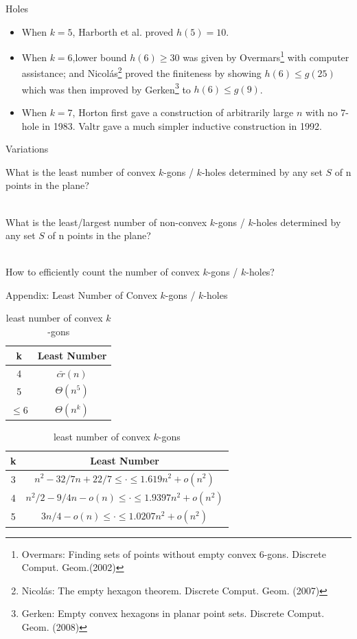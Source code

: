 \documentclass{beamer}
\begin{document}
\begin{frame}{Holes}

	\begin{itemize}
		\item
		      When $k=5$, Harborth et al. proved $h(5)=10$.
		\item
		      When $k=6$,lower bound $h(6) \ge 30$ was given by Overmars\footnote{Overmars: Finding sets of points without empty convex 6-gons. Discrete Comput. Geom.(2002)} with computer assistance; and Nicol\'as\footnote{Nicolás: The empty hexagon theorem. Discrete Comput. Geom. (2007)} proved the finiteness by showing $h(6) \le g(25)$ which was then improved by Gerken\footnote{Gerken: Empty convex hexagons in planar point sets. Discrete Comput. Geom. (2008)} to $h(6) \le g(9)$.
		\item
		      When $k=7$, Horton first gave a construction of arbitrarily large $n$ with no $7$-hole in 1983. Valtr gave a much simpler inductive construction  in 1992.

	\end{itemize}
\end{frame}

\begin{frame}{Variations}

	What is the least number of convex $k$-gons / $k$-holes determined by any set $S$ of n points in the plane? \\~\

	What is the least/largest number of non-convex $k$-gons / $k$-holes determined by any set $S$ of n points in the plane? \\~\

	How to efficiently count the number of convex $k$-gons / $k$-holes?

\end{frame}

\begin{frame}{Appendix: Least Number of Convex $k$-gons / $k$-holes}

	\begin{table}
		\begin{tabular}{c|c}
			k       & Least Number  \\
			\hline \hline
			4       & $\bar{cr}(n)$ \\
			5       & $\Theta(n^5)$ \\
			$\le 6$ & $\Theta(n^k)$
		\end{tabular}

		\caption{least number of convex $k$-gons}

		\begin{tabular}{c|c}
			k & Least Number                                         \\
			\hline \hline
			3 & $n^2 - 32/7n + 22/7 \le \cdot \le 1.619n^2 + o(n^2)$ \\
			4 & $n^2/2 -9/4n -o(n) \le \cdot \le 1.9397n^2 + o(n^2)$ \\
			5 & $3n/4-o(n)\le \cdot \le 1.0207n^2 + o(n^2)$
		\end{tabular}
		\caption{least number of convex $k$-gons}
	\end{table}
\end{frame}
\end{document}
